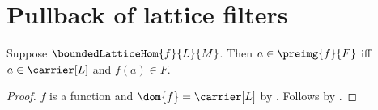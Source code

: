 \section{Pullback of lattice filters}




\begin{proposition}\label{bounded_lattice_hom_preimage_iff}
    Suppose $\boundedLatticeHom{f}{L}{M}$.
    Then $a\in\preimg{f}{F}$ iff
        $a\in\carrier[L]$ and $f(a)\in F$.
\end{proposition}
\begin{proof}
    $f$ is a function and $\dom{f}=\carrier[L]$ by
        .
    Follows by .
\end{proof}

